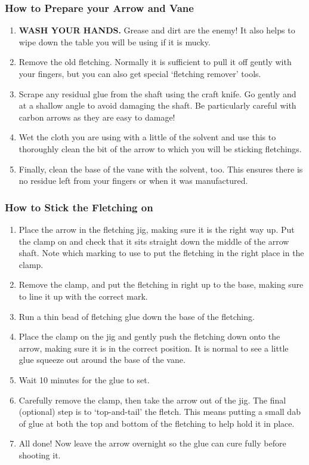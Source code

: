 \documentclass[12pt]{article}
\begin{document}
\subsubsection*{How to Prepare your Arrow and Vane}
\begin{enumerate}
	\item {\bf WASH YOUR HANDS.} Grease and dirt are the enemy! It also helps to wipe down the table you will be using if it is mucky.
	\item Remove the old fletching. Normally it is sufficient to pull it off gently with your fingers, but you can also get special `fletching remover' tools.
	\item Scrape any residual glue from the shaft using the craft knife. Go gently and at a shallow angle to avoid damaging the shaft. Be particularly careful with carbon arrows as they are easy to damage!
	\item Wet the cloth you are using with a little of the solvent and use this to thoroughly clean the bit of the arrow to which you will be sticking fletchings.
	\item Finally, clean the base of the vane with the solvent, too. This ensures there is no residue left from your fingers or when it was manufactured.
\end{enumerate}


\subsubsection*{How to Stick the Fletching on}
\begin{enumerate}
	\item Place the arrow in the fletching jig, making sure it is the right way up. Put the clamp on and check that it sits straight down the middle of the arrow shaft. Note which marking to use to put the fletching in the right place in the clamp.
	\item Remove the clamp, and put the fletching in right up to the base, making sure to line it up with the correct mark.
	\item Run a thin bead of fletching glue down the base of the fletching.
	\item Place the clamp on the jig and gently push the fletching down onto the arrow, making sure it is in the correct position. It is normal to see a little glue squeeze out around the base of the vane.
	\item Wait 10 minutes for the glue to set.
	\item Carefully remove the clamp, then take the arrow out of the jig. The final (optional) step is to `top-and-tail' the fletch. This means putting a small dab of glue at both the top and bottom of the fletching to help hold it in place.
	\item All done! Now leave the arrow overnight so the glue can cure fully before shooting it.
\end{enumerate}
\end{document}
